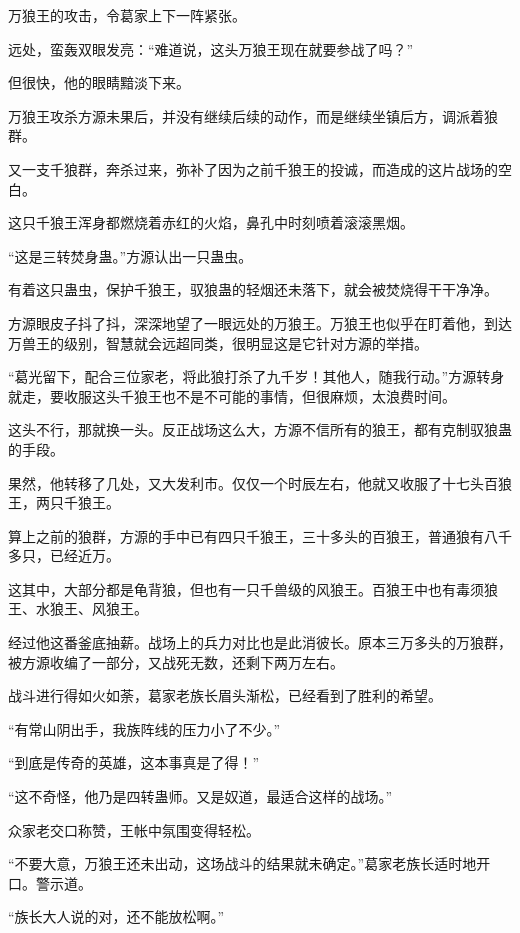 
\begin{this_body}

万狼王的攻击，令葛家上下一阵紧张。

远处，蛮轰双眼发亮：“难道说，这头万狼王现在就要参战了吗？”

但很快，他的眼睛黯淡下来。

万狼王攻杀方源未果后，并没有继续后续的动作，而是继续坐镇后方，调派着狼群。

又一支千狼群，奔杀过来，弥补了因为之前千狼王的投诚，而造成的这片战场的空白。

这只千狼王浑身都燃烧着赤红的火焰，鼻孔中时刻喷着滚滚黑烟。

“这是三转焚身蛊。”方源认出一只蛊虫。

有着这只蛊虫，保护千狼王，驭狼蛊的轻烟还未落下，就会被焚烧得干干净净。

方源眼皮子抖了抖，深深地望了一眼远处的万狼王。万狼王也似乎在盯着他，到达万兽王的级别，智慧就会远超同类，很明显这是它针对方源的举措。

“葛光留下，配合三位家老，将此狼打杀了九千岁！其他人，随我行动。”方源转身就走，要收服这头千狼王也不是不可能的事情，但很麻烦，太浪费时间。

这头不行，那就换一头。反正战场这么大，方源不信所有的狼王，都有克制驭狼蛊的手段。

果然，他转移了几处，又大发利市。仅仅一个时辰左右，他就又收服了十七头百狼王，两只千狼王。

算上之前的狼群，方源的手中已有四只千狼王，三十多头的百狼王，普通狼有八千多只，已经近万。

这其中，大部分都是龟背狼，但也有一只千兽级的风狼王。百狼王中也有毒须狼王、水狼王、风狼王。

经过他这番釜底抽薪。战场上的兵力对比也是此消彼长。原本三万多头的万狼群，被方源收编了一部分，又战死无数，还剩下两万左右。

战斗进行得如火如荼，葛家老族长眉头渐松，已经看到了胜利的希望。

“有常山阴出手，我族阵线的压力小了不少。”

“到底是传奇的英雄，这本事真是了得！”

“这不奇怪，他乃是四转蛊师。又是奴道，最适合这样的战场。”

众家老交口称赞，王帐中氛围变得轻松。

“不要大意，万狼王还未出动，这场战斗的结果就未确定。”葛家老族长适时地开口。警示道。

“族长大人说的对，还不能放松啊。”


\end{this_body}
